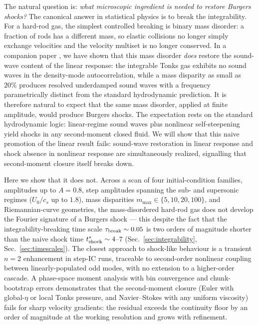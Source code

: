 \documentclass[aps,pre,twocolumn,superscriptaddress,longbibliography,floatfix]{revtex4-2}
\begin{document}
The natural question is: \emph{what microscopic ingredient is
needed to restore Burgers shocks?} The canonical answer in
statistical physics is to break the integrability. For a
hard-rod gas, the simplest controlled breaking is binary mass
disorder: a fraction of rods has a different mass, so elastic
collisions no longer simply exchange velocities and the velocity
multiset is no longer conserved. In a companion paper
\cite{PaperII}, we have shown that this mass disorder
\emph{does} restore the sound-wave content of the linear
response: the integrable Tonks gas exhibits no sound waves
in the density-mode autocorrelation, while a mass disparity as
small as $20\%$ produces resolved underdamped sound waves with
a frequency parametrically distinct from the standard
hydrodynamic prediction. It is therefore natural to expect that
the same mass disorder, applied at finite amplitude, would
produce Burgers shocks. The expectation rests on the standard
hydrodynamic logic: linear-regime sound waves plus nonlinear
self-steepening yield shocks in any second-moment closed
fluid. We will show that this naive promotion of the linear
result fails: sound-wave restoration in linear response and
shock absence in nonlinear response are simultaneously
realized, signalling that second-moment closure itself
breaks down.

Here we show that it does not. Across a scan of four
initial-condition families, amplitudes up to $A=0.8$, step
amplitudes spanning the sub- and supersonic regimes
($U_0/c_s$ up to $1.8$), mass disparities
$m_{\max}\in\{5,10,20,100\}$,
and Riemannian-curve geometries, the mass-disordered hard-rod
gas does not develop the Fourier signature of a Burgers shock --- this despite the
fact that the integrability-breaking time scale
$\tau_{\rm break}\sim 0.05$ is two orders of magnitude shorter
than the naive shock time $t^*_{\rm shock}\sim 4$--$7$
(Sec.~\ref{sec:integrability}, Sec.~\ref{sec:timescales}). The
closest approach to shock-like behaviour is a transient $n=2$
enhancement in step-IC runs, traceable to second-order
nonlinear coupling between linearly-populated odd modes, with
no extension to a higher-order cascade. A phase-space moment analysis with bin convergence
and chunk-bootstrap errors demonstrates that the second-moment
closure (Euler with global-$\eta$ or local Tonks pressure, and
Navier--Stokes with any uniform viscosity) fails for sharp
velocity gradients: the residual exceeds the continuity floor by
an order of magnitude at the working resolution and grows with
refinement.
\end{document}
